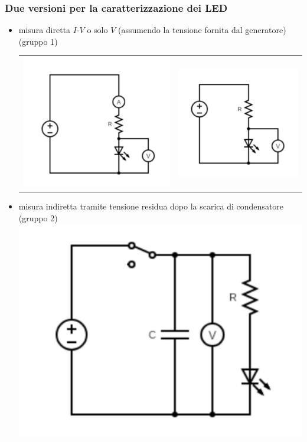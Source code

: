 \frame
{
  \frametitle{Due versioni per la caratterizzazione dei LED}
  \begin{itemize}
  \item misura diretta $I$-$V$ o solo $V$ (assumendo la tensione fornita dal generatore) (gruppo 1)
    \begin{tabular}{cc}
    \includegraphics[width=0.3\linewidth]{figs/Led1.pdf} &
    \includegraphics[width=0.3\linewidth]{figs/Led2.pdf}
    \end{tabular}
  \item misura indiretta tramite tensione residua dopo la scarica di condensatore        (gruppo 2)
    \includegraphics[width=0.3\linewidth]{figs/Led3.pdf}
  \end{itemize}

}

